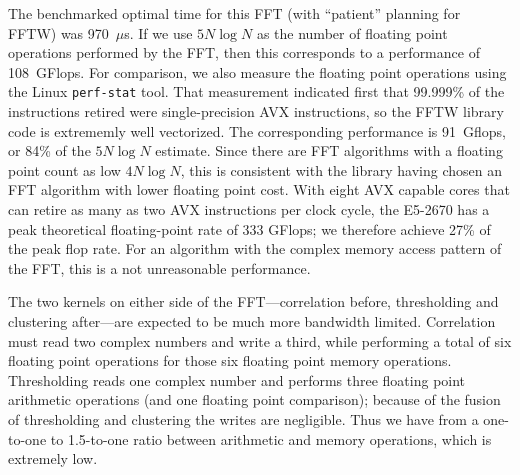 \documentclass{article}
\begin{document}
The benchmarked optimal time for this FFT (with ``patient'' planning for FFTW)
was 970~$\mu$s.  If we use $5N\log{N}$ as the number of floating point
operations performed by the FFT, then this corresponds to a performance of
108~GFlops. For comparison, we also measure the floating point operations using
the Linux \texttt{perf-stat} tool.  That measurement indicated first that
99.999\% of the instructions retired were single-precision AVX instructions, so
the FFTW library code is extrememly well vectorized.  The corresponding
performance is 91~Gflops, or 84\% of the $5N\log{N}$ estimate. Since there are
FFT algorithms with a floating point count as low $4N\log{N}$, this is
consistent with the library having chosen an FFT algorithm with lower floating
point cost.  With eight AVX capable cores that can retire as many as two AVX
instructions per clock cycle, the E5-2670 has a peak theoretical floating-point
rate of 333 GFlops; we therefore achieve 27\% of the peak flop rate.  For an
algorithm with the complex memory access pattern of the FFT, this is a not
unreasonable performance.

The two kernels on either side of the FFT---correlation before, thresholding and
clustering after---are expected to be much more bandwidth limited. Correlation
must read two complex numbers and write a third, while performing a total of six
floating point operations for those six floating point memory operations.
Thresholding reads one complex number and performs three floating point
arithmetic operations (and one floating point comparison); because of the fusion
of thresholding and clustering the writes are negligible. Thus we have from a
one-to-one to 1.5-to-one ratio between arithmetic and memory operations, which
is extremely low. 
\end{document}
